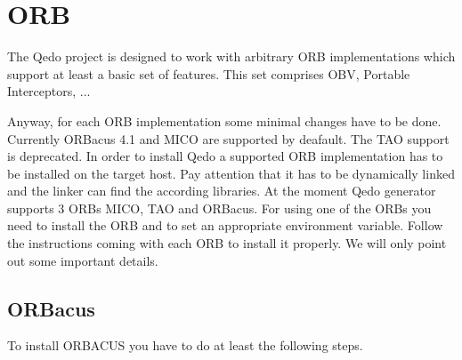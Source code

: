 \documentclass[12pt,a4paper]{report}
\begin{document}
\section{ORB}
\label{sec:ORB}
The Qedo project is designed to work with arbitrary ORB implementations which support at least a basic set of features. This set comprises OBV, Portable Interceptors, ... 

Anyway, for each ORB implementation some minimal changes have to be done. Currently ORBacus 4.1 and MICO are supported by deafault. The TAO support is deprecated. In order to install Qedo a supported ORB implementation has to be installed on the target host. Pay attention that it has to be dynamically linked and the linker can find the according libraries. At the moment Qedo generator supports 3 ORBs MICO, TAO and ORBacus. For using one of the ORBs you need to install the ORB and to set an appropriate environment variable. Follow the instructions coming with each ORB to install it properly. We will only point out some important details.

\subsection{ORBacus}
\label{sec:ORBacus}
To install ORBACUS you have to do at least the following steps.
\end{document}
